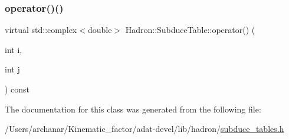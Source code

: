 \mbox{\label{classHadron_1_1SubduceTable_a999cf73415a42ed70a12a5c49dc24b0f}} 
\subsubsection{\texorpdfstring{operator()()}{operator()()}\hspace{0.1cm}{\footnotesize\ttfamily [3/3]}}
{\footnotesize\ttfamily virtual std\+::complex$<$double$>$ Hadron\+::\+Subduce\+Table\+::operator() (\begin{DoxyParamCaption}\item[{int}]{i,  }\item[{int}]{j }\end{DoxyParamCaption}) const\hspace{0.3cm}{\ttfamily [pure virtual]}}



The documentation for this class was generated from the following file\+:\begin{DoxyCompactItemize}
\item 
/\+Users/archanar/\+Kinematic\+\_\+factor/adat-\/devel/lib/hadron/\mbox{\hyperlink{adat-devel_2lib_2hadron_2subduce__tables_8h}{subduce\+\_\+tables.\+h}}\end{DoxyCompactItemize}
